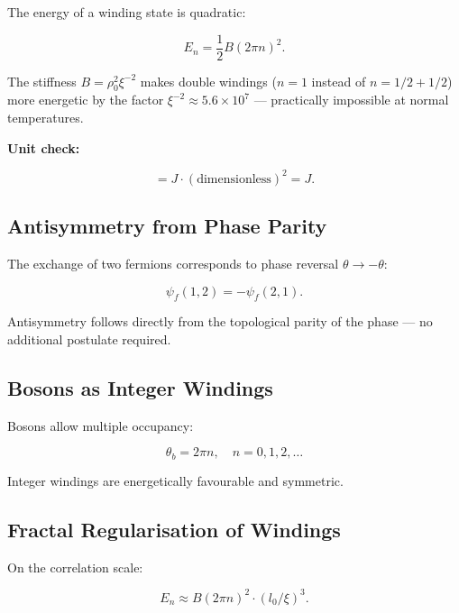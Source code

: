 	The energy of a winding state is quadratic:
	
	\begin{equation}
		E_n = \frac{1}{2} B (2\pi n)^2.
	\end{equation}
	
	The stiffness \(B = \rho_0^2 \xi^{-2}\) makes double windings (\(n=1\) instead of \(n=1/2 + 1/2\)) more energetic by the factor \(\xi^{-2} \approx 5.6 \times 10^7\) — practically impossible at normal temperatures.
	
	\textbf{Unit check:}
	
	\begin{equation}
		[E_n] = \si{J} \cdot (\text{dimensionless})^2 = \si{J}.
	\end{equation}
	
	\subsection*{Antisymmetry from Phase Parity}
	
	The exchange of two fermions corresponds to phase reversal \(\theta \to -\theta\):
	
	\begin{equation}
		\psi_f(1,2) = -\psi_f(2,1).
	\end{equation}
	
	Antisymmetry follows directly from the topological parity of the phase — no additional postulate required.
	
	\subsection*{Bosons as Integer Windings}
	
	Bosons allow multiple occupancy:
	
	\begin{equation}
		\theta_b = 2\pi n, \quad n = 0, 1, 2, \ldots
	\end{equation}
	
	Integer windings are energetically favourable and symmetric.
	
	\subsection*{Fractal Regularisation of Windings}
	
	On the correlation scale:
	
	\begin{equation}
		E_n \approx B (2\pi n)^2 \cdot (l_0 / \xi)^3.
	\end{equation}
	
